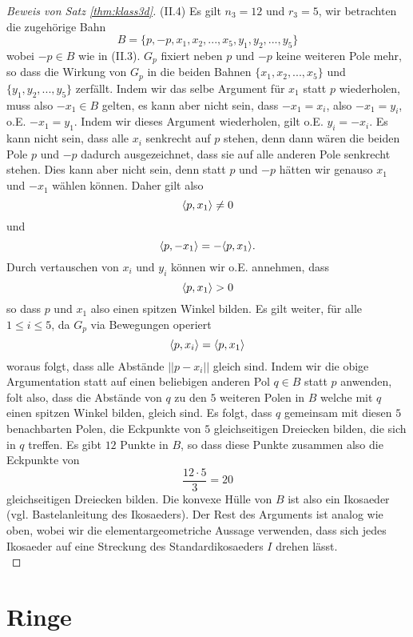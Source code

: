\documentclass{book}
\begin{document}
\begin{proof}[Beweis von Satz \ref{thm:klass3d}]
    \noindent
    (II.4) Es gilt $n_3 = 12$ und $r_3 = 5$, wir betrachten die zugehörige Bahn
    \[
        B = \{p, -p, x_1, x_2, ..., x_5, y_1, y_2, ..., y_5\}
    \]
    wobei $-p \in B$ wie in (II.3). $G_p$ fixiert neben $p$ und $-p$ keine
    weiteren Pole mehr, so dass die Wirkung von $G_p$ in die beiden Bahnen
    $\{x_1, x_2, ..., x_5\}$ und $\{y_1, y_2, ..., y_5\}$ zerfällt. Indem wir
    das selbe Argument für $x_1$ statt $p$ wiederholen, muss also $-x_1 \in B$
    gelten, es kann aber nicht sein, dass $-x_1 = x_i$, also $-x_1 = y_i$, o.E.
    $-x_1 = y_1$. Indem wir dieses Argument wiederholen, gilt o.E. $y_i =
    -x_i$. Es kann nicht sein, dass alle $x_i$ senkrecht auf $p$ stehen, denn
    dann wären die beiden Pole $p$ und $-p$ dadurch ausgezeichnet, dass sie auf
    alle anderen Pole senkrecht stehen. Dies kann aber nicht sein, denn statt
    $p$ und $-p$ hätten wir genauso $x_1$ und $-x_1$ wählen können. Daher gilt also 
    \[
        \langle p, x_1 \rangle \ne 0
    \]
    und 
    \[
        \langle p, -x_1 \rangle = - \langle p, x_1 \rangle.
    \]
    Durch vertauschen von $x_i$ und $y_i$ können wir o.E. annehmen, dass 
    \[
        \langle p, x_1 \rangle > 0
    \]
    so dass $p$ und $x_1$ also einen spitzen Winkel bilden. Es gilt weiter, für
    alle $1 \le i \le 5$, da $G_p$ via Bewegungen operiert
    \[
        \langle p, x_i \rangle = \langle p, x_1 \rangle
    \]
    woraus folgt, dass alle Abstände $||p - x_i||$ gleich sind. Indem wir die
    obige Argumentation statt auf einen beliebigen anderen Pol $q \in B$ statt
    $p$ anwenden, folt also, dass die Abstände von $q$ zu den $5$ weiteren
    Polen in $B$ welche mit $q$ einen spitzen Winkel bilden, gleich sind. Es
    folgt, dass $q$ gemeinsam mit diesen $5$ benachbarten Polen, die Eckpunkte
    von $5$ gleichseitigen Dreiecken bilden, die sich in $q$ treffen. Es gibt
    $12$ Punkte in $B$, so dass diese Punkte zusammen also die Eckpunkte von
    \[
        \frac{12 \cdot 5}{3} = 20
    \]
    gleichseitigen Dreiecken bilden. Die konvexe Hülle von $B$ ist also ein
    Ikosaeder (vgl. Bastelanleitung des Ikosaeders). Der Rest des Arguments ist
    analog wie oben, wobei wir die elementargeometriche Aussage verwenden, dass
    sich jedes Ikosaeder auf eine Streckung des Standardikosaeders $I$ drehen
    lässt.\\ 
\end{proof}

\chapter{Ringe}%
\label{cha:ringe}
\end{document}
